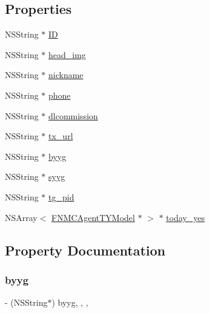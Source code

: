 \subsection*{Properties}
\begin{DoxyCompactItemize}
\item 
N\+S\+String $\ast$ \mbox{\hyperlink{interface_f_n_m_c_agent_model_a3eb33d4e3d779ad051366645a1a041ac}{ID}}
\item 
N\+S\+String $\ast$ \mbox{\hyperlink{interface_f_n_m_c_agent_model_ae5aad8aa36faf9316f82acbac256c005}{head\+\_\+img}}
\item 
N\+S\+String $\ast$ \mbox{\hyperlink{interface_f_n_m_c_agent_model_aac9f8c76cdb2dc540e94a3ed9f537ee2}{nickname}}
\item 
N\+S\+String $\ast$ \mbox{\hyperlink{interface_f_n_m_c_agent_model_a8cd981a2b51102d3e0449c9ea739e53e}{phone}}
\item 
N\+S\+String $\ast$ \mbox{\hyperlink{interface_f_n_m_c_agent_model_a9d188532d51bc218a6e824bbf344d2db}{dlcommission}}
\item 
N\+S\+String $\ast$ \mbox{\hyperlink{interface_f_n_m_c_agent_model_a9a35f7986ae552b21373d3234d3d187c}{tx\+\_\+url}}
\item 
N\+S\+String $\ast$ \mbox{\hyperlink{interface_f_n_m_c_agent_model_a450b87810732c289dce9a504fb09adaf}{byyg}}
\item 
N\+S\+String $\ast$ \mbox{\hyperlink{interface_f_n_m_c_agent_model_ace906f02084e8cba989ac2d7ecace8d8}{syyg}}
\item 
N\+S\+String $\ast$ \mbox{\hyperlink{interface_f_n_m_c_agent_model_a6b89df8ec3267aed71c76c56e7273e4d}{tg\+\_\+pid}}
\item 
N\+S\+Array$<$ \mbox{\hyperlink{interface_f_n_m_c_agent_t_y_model}{F\+N\+M\+C\+Agent\+T\+Y\+Model}} $\ast$ $>$ $\ast$ \mbox{\hyperlink{interface_f_n_m_c_agent_model_a2dfe1327d3ad029e901a2fee1424b124}{today\+\_\+yes}}
\end{DoxyCompactItemize}


\subsection{Property Documentation}
\mbox{\label{interface_f_n_m_c_agent_model_a450b87810732c289dce9a504fb09adaf}} 
\subsubsection{\texorpdfstring{byyg}{byyg}}
{\footnotesize\ttfamily -\/ (N\+S\+String$\ast$) byyg\hspace{0.3cm}{\ttfamily [read]}, {\ttfamily [write]}, {\ttfamily [nonatomic]}, {\ttfamily [copy]}}

